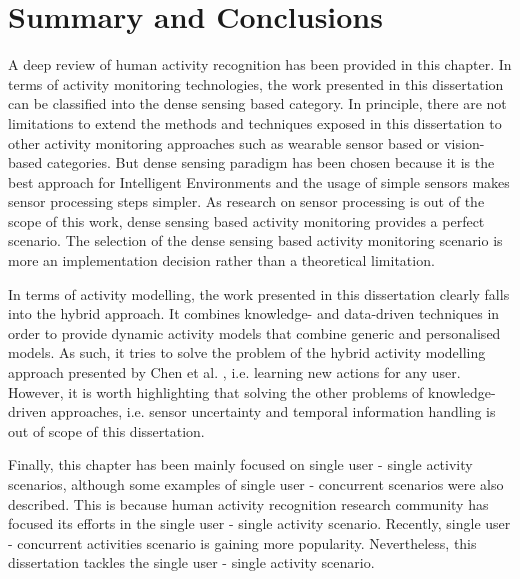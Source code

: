 \section{Summary and Conclusions}
\label{sec:soa:summary}


A deep review of human activity recognition has been provided in this chapter. In terms of activity monitoring technologies, the work presented in this dissertation can be classified into the dense sensing based category. In principle, there are not limitations to extend the methods and techniques exposed in this dissertation to other activity monitoring approaches such as wearable sensor based or vision-based categories. But dense sensing paradigm has been chosen because it is the best approach for Intelligent Environments and the usage of simple sensors makes sensor processing steps simpler. As research on sensor processing is out of the scope of this work, dense sensing based activity monitoring provides a perfect scenario. The selection of the dense sensing based activity monitoring scenario is more an implementation decision rather than a theoretical limitation.

In terms of activity modelling, the work presented in this dissertation clearly falls into the hybrid approach. It combines knowledge- and data-driven techniques in order to provide dynamic activity models that combine generic and personalised models. As such, it tries to solve the problem of the hybrid activity modelling approach presented by Chen et al. \cite{Chen2014}, i.e. learning new actions for any user. However, it is worth highlighting that solving the other problems of knowledge-driven approaches, i.e. sensor uncertainty and temporal information handling is out of scope of this dissertation.

Finally, this chapter has been mainly focused on single user - single activity scenarios, although some examples of single user - concurrent scenarios were also described. This is because human activity recognition research community has focused its efforts in the single user - single activity scenario. Recently, single user - concurrent activities scenario is gaining more popularity. Nevertheless, this dissertation tackles the single user - single activity scenario. 